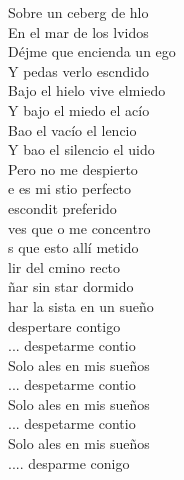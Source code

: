 \begin{cancion}[Despertar][Estopa]
	  Sobre un ceberg de hlo\\
	    En el mar de los lvidos\\
	Déjme que encienda un ego\\
	Y pedas verlo escndido\\
	 Bajo el hielo vive elmiedo\\
	  Y bajo el miedo el acío\\
	Bao el vacío el lencio\\
	Y bao el silencio el uido\\
	    Pero no me despierto\\
	e es mi stio perfecto\\
	 escondit preferido\\
	 ves que o me concentro\\
	s que esto allí metido\\
	lir del cmino recto\\
	ñar sin star dormido\\
	har la sista en un sueño\\
	 despertare contigo\\
	... despetarme contio\\
	Solo ales en mis sueños\\
	... despetarme contio\\
	Solo ales en mis sueños\\
	... despetarme contio\\
	Solo ales en mis sueños\\
	.... desparme conigo\\
	         \\
\end{cancion}%

